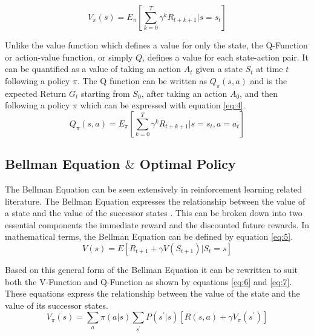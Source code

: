 \begin{equation}\label{eq:3}
    V_{\pi} (s) = E_{\pi} [\sum_{k=0}^{T} \gamma^{k} R_{t+k+1} | s=s_t]
\end{equation}

Unlike the value function which defines a value for only the state, the Q-Function or action-value function, or simply $Q$, defines a value for each state-action pair. It can be quantified as a value of taking an action $A_t$ given a state $S_t$ at time $t$ following a policy $\pi$. The Q function can be written as $Q_{\pi} (s, a)$ and is the expected Return $G_t$ starting from $S_0$, after taking an action $A_0$, and then following a policy $\pi$ which can be expressed with equation \ref{eq:4}. \\

\begin{equation}\label{eq:4}
    Q_{\pi} (s, a) = E_{\pi} [\sum_{k=0}^{T} \gamma^{k} R_{t+k+1} | s=s_t, a=a_t]
\end{equation}

\subsection{Bellman Equation $\&$ Optimal Policy}

The Bellman Equation \cite{DPBE} \cite{BE} can be seen extensively in reinforcement learning related literature. The Bellman Equation expresses the relationship between the value of a state and the value of the successor states \cite{Sutton1998}. This can be broken down into two essential components the immediate reward and the discounted future rewards. In mathematical terms, the Bellman Equation can be defined by equation \ref{eq:5}. \\

\begin{equation}\label{eq:5}
    V(s) = E [R_{t+1} + \gamma V(S_{t+1}) | S_t = s]
\end{equation}

Based on this general form of the Bellman Equation it can be rewritten to suit both the V-Function and Q-Function as shown by equations \ref{eq:6} and \ref{eq:7}. These equations express the relationship between the value of the state and the value of its successor states. \\

\begin{equation}\label{eq:6}
    V_{\pi}(s) = \sum_{a} \pi (a|s)\sum_{s^{'}} P(s^{'}|s) [R(s, a) + \gamma V_{\pi} (s^{'})]
\end{equation}

